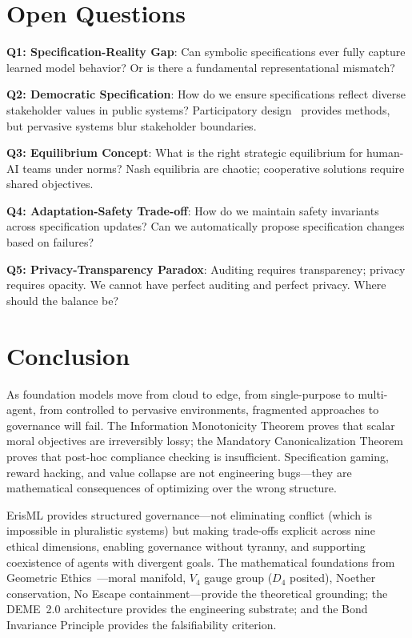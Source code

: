 \documentclass[conference]{IEEEtran}
\begin{document}
\section{Open Questions}
\label{sec:open-questions}

\textbf{Q1: Specification-Reality Gap}: Can symbolic specifications ever
fully capture learned model behavior? Or is there a fundamental
representational mismatch?

\textbf{Q2: Democratic Specification}: How do we ensure specifications
reflect diverse stakeholder values in public systems? Participatory
design~\cite{simonsen2012} provides methods, but pervasive systems blur stakeholder
boundaries.

\textbf{Q3: Equilibrium Concept}: What is the right strategic
equilibrium for human-AI teams under norms? Nash equilibria are chaotic;
cooperative solutions require shared objectives.

\textbf{Q4: Adaptation-Safety Trade-off}: How do we maintain safety
invariants across specification updates? Can we automatically propose
specification changes based on failures?

\textbf{Q5: Privacy-Transparency Paradox}: Auditing requires
transparency; privacy requires opacity. We cannot have perfect auditing
and perfect privacy. Where should the balance be?

\section{Conclusion}
\label{sec:conclusion}

As foundation models move from cloud to edge, from single-purpose to
multi-agent, from controlled to pervasive environments, fragmented
approaches to governance will fail. The Information Monotonicity Theorem proves that scalar moral objectives are irreversibly lossy; the Mandatory Canonicalization Theorem proves that post-hoc compliance checking is insufficient. Specification gaming, reward hacking, and value collapse are not engineering bugs---they are mathematical consequences of optimizing over the wrong structure.

ErisML provides structured governance---not eliminating conflict (which
is impossible in pluralistic systems) but making trade-offs explicit
across nine ethical dimensions, enabling governance without tyranny, and supporting coexistence of
agents with divergent goals. The mathematical foundations from Geometric Ethics~\cite{bond2026ge}---moral manifold, $V_4$ gauge group ($D_4$ posited), Noether conservation, No Escape containment---provide the theoretical grounding; the DEME~2.0 architecture provides the engineering substrate; and the Bond Invariance Principle provides the falsifiability criterion.
\end{document}
